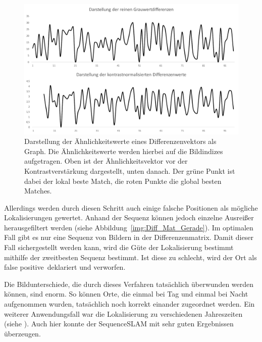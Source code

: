\documentclass[12pt,a4paper,titlepage]{scrartcl}
\begin{document}
\begin{figure}[h]
	\centering
	\includegraphics[width=1.0\textwidth]{../Bilder/lokale_Kontrastverstaerkung.pdf}
	\caption[Lokale Kontrastnormalisierung der Grauwertvektoren]{Darstellung der Ähnlichkeitswerte eines Differenzenvektors als Graph. Die Ähnlichkeitswerte werden hierbei auf die Bildindizes aufgetragen. Oben ist der Ähnlichkeitsvektor vor der Kontrastverstärkung dargestellt, unten danach. Der grüne Punkt ist dabei der lokal beste Match, die roten Punkte die global besten Matches.}
	\label{img:Kon_Verst}
\end{figure}

Allerdings werden durch diesen Schritt auch einige falsche Positionen als mögliche Lokalisierungen gewertet. Anhand der Sequenz können jedoch einzelne Ausreißer herausgefiltert werden (siehe Abbildung~\ref{img:Diff_Mat_Gerade}). Im optimalen Fall gibt es nur eine Sequenz von Bildern in der Differenzenmatrix. Damit dieser Fall sichergestellt werden kann, wird die Güte der Lokalisierung bestimmt mithilfe der zweitbesten Sequenz bestimmt. Ist diese zu schlecht, wird der Ort als \glqq false positive\grqq \ deklariert und verworfen.

Die Bildunterschiede, die durch dieses Verfahren tatsächlich überwunden werden können, sind enorm. So können Orte, die einmal bei Tag und einmal bei Nacht aufgenommen wurden, tatsächlich noch korrekt einander zugeordnet werden. Ein weiterer Anwendungsfall war die Lokalisierung zu verschiedenen Jahreszeiten (siehe \cite{sunderhauf2013we}). Auch hier konnte der SequenceSLAM mit sehr guten Ergebnissen überzeugen.
\end{document}
